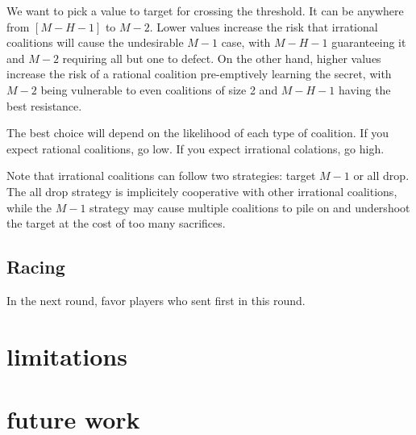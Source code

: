 \documentclass{article}
\begin{document}
We want to pick a value to target for crossing the threshold. It can be anywhere from $[M-H-1]$ to $M - 2$. Lower values increase the risk that irrational coalitions will cause the undesirable $M-1$ case, with $M-H-1$ guaranteeing it and $M-2$ requiring all but one to defect. On the other hand, higher values increase the risk of a rational coalition pre-emptively learning the secret, with $M-2$ being vulnerable to even coalitions of size 2 and $M-H-1$ having the best resistance.

The best choice will depend on the likelihood of each type of coalition. If you expect rational coalitions, go low. If you expect irrational colations, go high.

Note that irrational coalitions can follow two strategies: target $M-1$ or all drop. The all drop strategy is implicitely cooperative with other irrational coalitions, while the $M-1$ strategy may cause multiple coalitions to pile on and undershoot the target at the cost of too many sacrifices.

\subsection{Racing}
In the next round, favor players who sent first in this round.

\section{limitations}
\section{future work}
\end{document}
